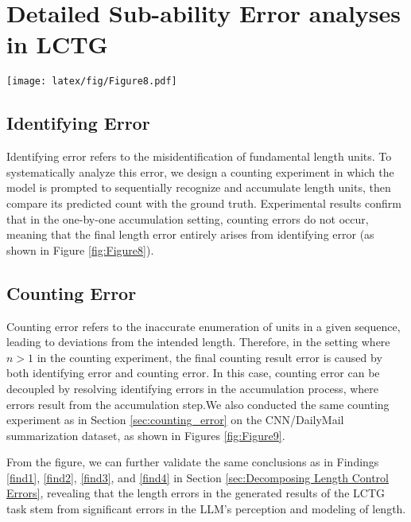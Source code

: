 \section{Detailed Sub-ability Error analyses in LCTG}
\label{sec:Sub-ability Decomposition}

\begin{figure*}[ht]
\centering
  \texttt{[image: latex/fig/Figure8.pdf]}
  \caption{Schematic diagram of counting experiment under the condition of \( n=1 \)}
  \label{fig:Figure8}
\end{figure*}

\subsection{Identifying Error}  
Identifying error refers to the misidentification of fundamental length units. To systematically analyze this error, we design a counting experiment in which the model is prompted to sequentially recognize and accumulate length units, then compare its predicted count with the ground truth. Experimental results confirm that in the one-by-one accumulation setting, counting errors do not occur, meaning that the final length error entirely arises from identifying error (as shown in Figure \ref{fig:Figure8}).

\subsection{Counting Error}  
Counting error refers to the inaccurate enumeration of units in a given sequence, leading to deviations from the intended length. Therefore, in the setting where \(n > 1\) in the counting experiment, the final counting result error is caused by both identifying error and counting error. In this case, counting error can be decoupled by resolving identifying errors in the accumulation process, where errors result from the accumulation step.We also conducted the same counting experiment as in Section \ref{sec:counting_error} on the CNN/DailyMail summarization dataset, as shown in Figures \ref{fig:Figure9}.

From the figure, we can further validate the same conclusions as in Findings \ref{find1}, \ref{find2}, \ref{find3}, and \ref{find4} in Section \ref{sec:Decomposing Length Control Errors}, revealing that the length errors in the generated results of the LCTG task stem from significant errors in the LLM's perception and modeling of length.



